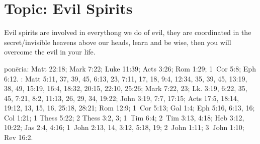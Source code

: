 \section{Topic: Evil Spirits}

Evil spirits are involved in everythong we do of evil, they are coordinated in the secret/invisible heavens above our heads, learn and be wise, then you will overcome the evil in your life. 

\gls{ponēria}: Matt 22:18; Mark 7:22; Luke 11:39; Acts 3:26; Rom 1:29; 1~Cor 5:8; Eph 6:12. : Matt 5:11, 37, 39, 45, 6:13, 23, 7:11, 17, 18, 9:4, 12:34, 35, 39, 45, 13:19, 38, 49, 15:19, 16:4, 18:32, 20:15, 22:10, 25:26; Mark 7:22, 23; Lk. 3:19, 6:22, 35, 45, 7:21, 8:2, 11:13, 26, 29, 34, 19:22; John 3:19, 7:7, 17:15; Acts 17:5, 18:14, 19:12, 13, 15, 16, 25:18, 28:21; Rom 12:9; 1~Cor 5:13; Gal 1:4; Eph 5:16, 6:13, 16; Col 1:21; 1 Thess 5:22; 2 Thess 3:2, 3; 1~Tim 6:4; 2~Tim 3:13, 4:18; Heb 3:12, 10:22; Jas 2:4, 4:16; 1~John 2:13, 14, 3:12, 5:18, 19; 2~John 1:11; 3~John 1:10; Rev 16:2.

